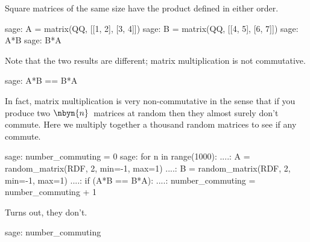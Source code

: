 Square matrices of the same size have the product defined in either order.
\begin{sagecommandline}
sage: A = matrix(QQ, [[1, 2], [3, 4]])
sage: B = matrix(QQ, [[4, 5], [6, 7]])
sage: A*B
sage: B*A
\end{sagecommandline}
Note that the two results are
different; matrix multiplication is not commutative.
\begin{sagecommandline}[d,0,2]
sage: A*B == B*A
\end{sagecommandline}

In fact, matrix multiplication is very non-commutative 
in the sense that if you produce two $\nbyn{n}$~matrices
at random then they almost surely don't commute.
Here we multiply together a thousand random matrices to see
if any commute.
\begin{sagecommandline}
sage: number_commuting = 0 
sage: for n in range(1000):                                       
....:     A = random_matrix(RDF, 2, min=-1, max=1)
....:     B = random_matrix(RDF, 2, min=-1, max=1)
....:     if (A*B == B*A):
....:         number_commuting = number_commuting + 1 
\end{sagecommandline}
Turns out, they don't.
\begin{sagecommandline}
sage: number_commuting
\end{sagecommandline}

 


